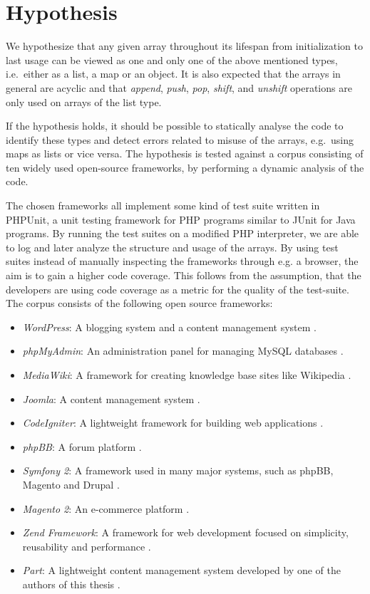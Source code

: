 \section{Hypothesis}
\label{sec:dynhypothesis}
We hypothesize that any given array throughout its lifespan from initialization to last usage can be viewed as one and only one of the above mentioned types, i.e.\ either as a list, a map or an object. It is also expected that the arrays in general are acyclic and that \emph{append}, \textit{push}, \textit{pop}, \textit{shift}, and \textit{unshift} operations are only used on arrays of the list type.

If the hypothesis holds, it should be possible to statically analyse the code to identify these types and detect errors related to misuse of the arrays, e.g.\ using maps as lists or vice versa. The hypothesis is tested against a corpus consisting of ten widely used open-source frameworks, by performing a dynamic analysis of the code.

The chosen frameworks all implement some kind of test suite written in PHPUnit, a unit testing framework for PHP programs similar to JUnit for Java programs. By running the test suites on a modified PHP interpreter, we are able to log and later analyze the structure and usage of the arrays. By using test suites instead of manually inspecting the frameworks through e.g. a browser, the aim is to gain a higher code coverage. This follows from the assumption, that the developers are using code coverage as a metric for the quality of the test-suite. The corpus consists of the following open source frameworks:

\begin{itemize}
    \item \emph{WordPress}: A blogging system and a content management system .
    \item \emph{phpMyAdmin}: An administration panel for managing MySQL databases .
    \item \emph{MediaWiki}: A framework for creating knowledge base sites like Wikipedia .
    \item \emph{Joomla}: A content management system .
    \item \emph{CodeIgniter}: A lightweight framework for building web applications .
    \item \emph{phpBB}: A forum platform .
    \item \emph{Symfony 2}: A framework used in many major systems, such as phpBB, Magento and Drupal .
    \item \emph{Magento 2}: An e-commerce platform .
    \item \emph{Zend Framework}: A framework for web development focused on simplicity, reusability and performance .
    \item \emph{Part}: A lightweight content management system developed by one of the authors of this thesis .
\end{itemize}